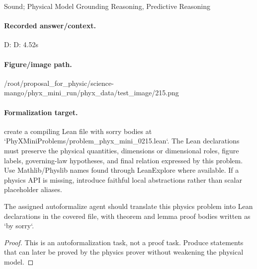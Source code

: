 Sound; Physical Model Grounding Reasoning, Predictive Reasoning

\paragraph{Recorded answer/context.}
D: D: 4.52s

\paragraph{Figure/image path.}
/root/proposal\_for\_physic/science-mango/phyx\_mini\_run/phyx\_data/test\_image/215.png

\paragraph{Formalization target.}
create a compiling Lean file with sorry bodies at `PhyXMiniProblems/problem\_phyx\_mini\_0215.lean`. The Lean declarations must preserve the physical quantities, dimensions or dimensional roles, figure labels, governing-law hypotheses, and final relation expressed by this problem.
Use Mathlib/Physlib names found through LeanExplore where available. If a physics API is missing, introduce faithful local abstractions rather than scalar placeholder aliases.

\begin{theorem}
\label{thm:physics:phyx_mini_0215:target}
The assigned autoformalize agent should translate this physics problem into Lean declarations in the covered file, with theorem and lemma proof bodies written as `by sorry`.
\end{theorem}
\begin{proof}
This is an autoformalization task, not a proof task. Produce statements that can later be proved by the physics prover without weakening the physical model.
\end{proof}

